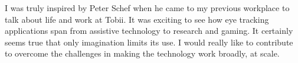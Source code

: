 \documentclass[11pt, a4paper]{../awesome-cv} %
\begin{document}
\sloppy %

\makecvheader %

\makelettertitle %


\begin{cvletter}
\vspace{.2cm}
I was truly inspired by Peter Schef when he came to my previous workplace to talk about life and work at Tobii. 
It was exciting to see how eye tracking applications span from assistive technology to research and gaming.
It certainly seems true that only imagination limits its use.
I would really like to contribute to overcome the challenges in making the technology work broadly, at scale.



\end{cvletter}
\end{document}
